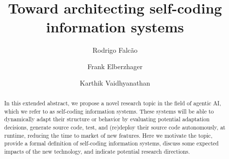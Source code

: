 \documentclass[sigconf]{acmart}
\theoremstyle{definition}
\begin{document}
\title{Toward architecting self-coding information systems}




\author{Rodrigo Falc\~{a}o}

\author{Frank Elberzhager}

\author{Karthik Vaidhyanathan}


\renewcommand{\shortauthors}{Falc\~{a}o et al.}

\begin{abstract}


In this extended abstract, we propose a novel research topic in the field of agentic AI, which we refer to as self-coding information systems. These systems will be able to dynamically adapt their structure or behavior by evaluating potential adaptation decisions, generate source code, test, and (re)deploy their source code autonomously, at runtime, reducing the time to market of new features. Here we motivate the topic, provide a formal definition of self-coding information systems, discuss some expected impacts of the new technology, and indicate potential research directions.



  
\end{abstract}
\end{document}
